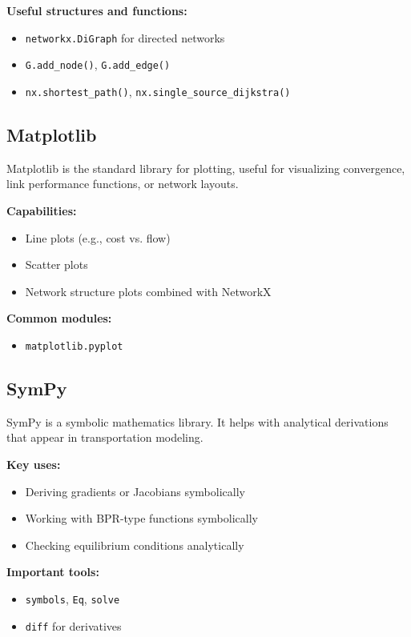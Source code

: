 \documentclass{rapportCS} %
\begin{document}
\textbf{Useful structures and functions:}
\begin{itemize}
    \item \texttt{networkx.DiGraph} for directed networks
    \item \texttt{G.add\_node()}, \texttt{G.add\_edge()}
    \item \texttt{nx.shortest\_path()}, \texttt{nx.single\_source\_dijkstra()}
\end{itemize}

\subsection{Matplotlib}
Matplotlib is the standard library for plotting, useful for visualizing convergence, link performance functions, or network layouts.

\textbf{Capabilities:}
\begin{itemize}
    \item Line plots (e.g., cost vs. flow)
    \item Scatter plots
    \item Network structure plots combined with NetworkX
\end{itemize}

\textbf{Common modules:}
\begin{itemize}
    \item \texttt{matplotlib.pyplot}
\end{itemize}

\subsection{SymPy}
SymPy is a symbolic mathematics library. It helps with analytical derivations that appear in transportation modeling.

\textbf{Key uses:}
\begin{itemize}
    \item Deriving gradients or Jacobians symbolically
    \item Working with BPR-type functions symbolically
    \item Checking equilibrium conditions analytically
\end{itemize}

\textbf{Important tools:}
\begin{itemize}
    \item \texttt{symbols}, \texttt{Eq}, \texttt{solve}
    \item \texttt{diff} for derivatives
\end{itemize}
\end{document}
